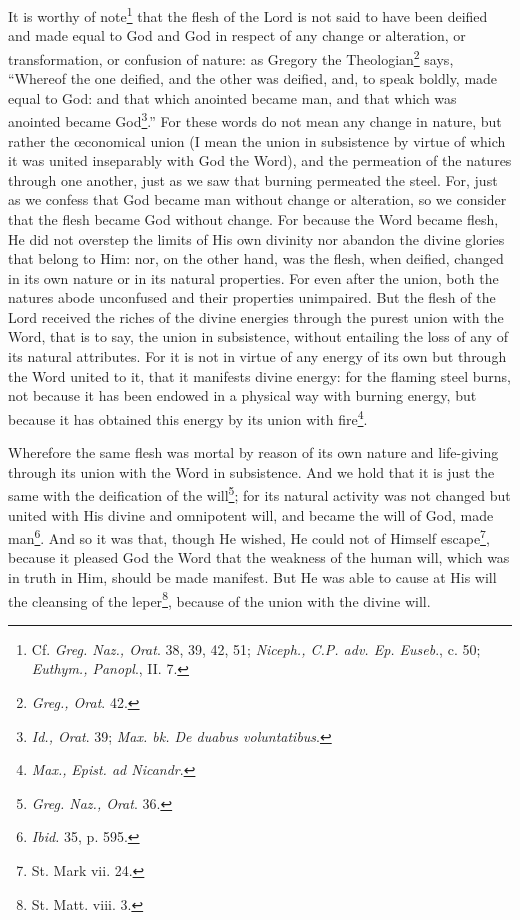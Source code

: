 It is worthy of note\footnote{Cf. \emph{Greg. Naz., Orat}. 38, 39, 42, 51; \emph{Niceph., C.P. adv. Ep. Euseb}., c. 50; \emph{Euthym., Panopl}., II. 7.} that the flesh of the Lord is not said to have been deified and made equal to God and God in respect of any change or alteration, or transformation, or confusion of nature: as Gregory the Theologian\footnote{\emph{Greg., Orat}. 42.} says, “Whereof the one deified, and the other was deified, and, to speak boldly, made equal to God: and that which anointed became man, and that which was anointed became God\footnote{\emph{Id., Orat}. 39; \emph{Max. bk. De duabus voluntatibus}.}.” For these words do not mean any change in nature, but rather the œconomical union (I mean the union in subsistence by virtue of which it was united inseparably with God the Word), and the permeation of the natures through one another, just as we saw that burning permeated the steel. For, just as we confess that God became man without change or alteration, so we consider that the flesh became God without change. For because the Word became flesh, He did not overstep the limits of His own divinity nor abandon the divine glories that belong to Him: nor, on the other hand, was the flesh, when deified, changed in its own nature or in its natural properties. For even after the union, both the natures abode unconfused and their properties unimpaired. But the flesh of the Lord received the riches of the divine energies through the purest union with the Word, that is to say, the union in subsistence, without entailing the loss of any of its natural attributes. For it is not in virtue of any energy of its own but through the Word united to it, that it manifests divine energy: for the flaming steel burns, not because it has been endowed in a physical way with burning energy, but because it has obtained this energy by its union with fire\footnote{\emph{Max.,} \emph{Epist. ad Nicandr}.}.

Wherefore the same flesh was mortal by reason of its own nature and life-giving through its union with the Word in subsistence. And we hold that it is just the same with the deification of the will\footnote{\emph{Greg. Naz., Orat}. 36.}; for its natural activity was not changed but united with His divine and omnipotent will, and became the will of God, made man\footnote{\emph{Ibid. }35, p. 595.}. And so it was that, though He wished, He could not of Himself escape\footnote{St. Mark vii. 24.}, because it pleased God the Word that the weakness of the human will, which was in truth in Him, should be made manifest. But He was able to cause at His will the cleansing of the leper\footnote{St. Matt. viii. 3.}, because of the union with the divine will.

